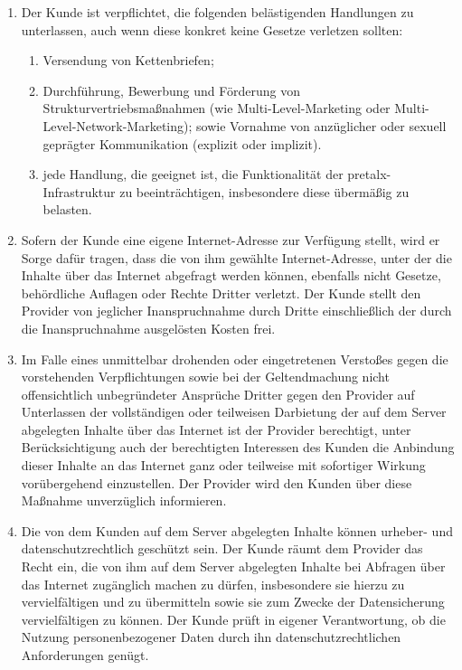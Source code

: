 \documentclass{terms}
\begin{document}
\begin{enumerate}
\item Der Kunde ist verpflichtet, die folgenden belästigenden Handlungen zu unterlassen, auch wenn diese konkret keine Gesetze verletzen sollten: \begin{enumerate}
\item Versendung von Kettenbriefen;
\item Durchführung, Bewerbung und Förderung von Strukturvertriebsmaßnahmen (wie Multi-Level-Marketing oder Multi-Level-Network-Marketing); sowie Vornahme von anzüglicher oder sexuell geprägter Kommunikation (explizit oder implizit).
\item jede Handlung, die geeignet ist, die Funktionalität der pretalx-Infrastruktur zu beeinträchtigen, insbesondere diese übermäßig zu belasten.
\end{enumerate}

\item Sofern der Kunde eine eigene Internet-Adresse zur Verfügung stellt, wird er Sorge dafür tragen, dass die von ihm gewählte Internet-Adresse, unter der die Inhalte über das Internet abgefragt werden können, ebenfalls nicht Gesetze, behördliche Auflagen oder Rechte Dritter verletzt.
      Der Kunde stellt den Provider von jeglicher Inanspruchnahme durch Dritte einschließlich der durch die Inanspruchnahme ausgelösten Kosten frei.
\item Im Falle eines unmittelbar drohenden oder eingetretenen Verstoßes gegen die vorstehenden Verpflichtungen sowie bei der Geltendmachung nicht offensichtlich unbegründeter Ansprüche Dritter gegen den Provider auf Unterlassen der vollständigen oder teilweisen Darbietung der auf dem Server abgelegten Inhalte über das Internet ist der Provider berechtigt, unter Berücksichtigung auch der berechtigten Interessen des Kunden die Anbindung dieser Inhalte an das Internet ganz oder teilweise mit sofortiger Wirkung vorübergehend einzustellen.
      Der Provider wird den Kunden über diese Maßnahme unverzüglich informieren.
\item Die von dem Kunden auf dem Server abgelegten Inhalte können urheber- und datenschutzrechtlich geschützt sein.
      Der Kunde räumt dem Provider das Recht ein, die von ihm auf dem Server abgelegten Inhalte bei Abfragen über das Internet zugänglich machen zu dürfen, insbesondere sie hierzu zu vervielfältigen und zu übermitteln sowie sie zum Zwecke der Datensicherung vervielfältigen zu können.
      Der Kunde prüft in eigener Verantwortung, ob die Nutzung personenbezogener Daten durch ihn datenschutzrechtlichen Anforderungen genügt.
\end{enumerate}
\end{document}
